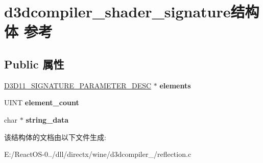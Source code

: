 \hypertarget{structd3dcompiler__shader__signature}{}\section{d3dcompiler\+\_\+shader\+\_\+signature结构体 参考}
\label{structd3dcompiler__shader__signature}
\subsection*{Public 属性}
\begin{DoxyCompactItemize}
\item 
\mbox{\label{structd3dcompiler__shader__signature_a2b16ec604252cf64d9ab56230dadc384}} 
\hyperlink{struct___d3_d11___s_i_g_n_a_t_u_r_e___p_a_r_a_m_e_t_e_r___d_e_s_c}{D3\+D11\+\_\+\+S\+I\+G\+N\+A\+T\+U\+R\+E\+\_\+\+P\+A\+R\+A\+M\+E\+T\+E\+R\+\_\+\+D\+E\+SC} $\ast$ {\bfseries elements}
\item 
\mbox{\label{structd3dcompiler__shader__signature_a6c05904cb8fb36759445c993460e18c1}} 
U\+I\+NT {\bfseries element\+\_\+count}
\item 
\mbox{\label{structd3dcompiler__shader__signature_a1cee47faf3aa844d32e25504794b3e16}} 
char $\ast$ {\bfseries string\+\_\+data}
\end{DoxyCompactItemize}


该结构体的文档由以下文件生成\+:\begin{DoxyCompactItemize}
\item 
E\+:/\+React\+O\+S-\/0../dll/directx/wine/d3dcompiler\+\_/reflection.\+c\end{DoxyCompactItemize}
